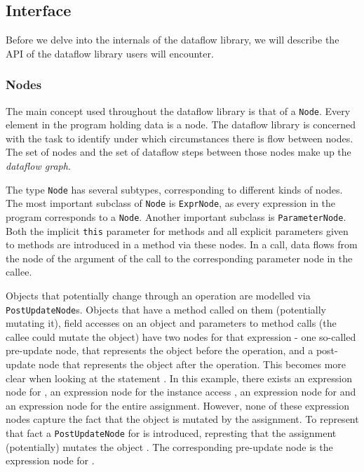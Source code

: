 \subsection{Interface}
Before we delve into the internals of the dataflow library, we will describe the API 
of the dataflow library users will encounter.

\subsubsection*{Nodes}
The main concept used throughout the dataflow library is that of a \texttt{Node}.
Every element in the program holding data is a node.
The dataflow library is concerned with the task to identify 
under which circumstances there is flow between nodes.
The set of nodes and the set of dataflow steps between those nodes make up the 
\emph{dataflow graph}.

The type \texttt{Node} has several subtypes, corresponding to different kinds of nodes.
The most important subclass of \texttt{Node} is \texttt{ExprNode}, 
as every expression in the program corresponds to a \texttt{Node}.
Another important subclass is \texttt{ParameterNode}.
Both the implicit \texttt{this} parameter for methods and all explicit parameters
given to methods are introduced in a method via these nodes.
In a call, data flows from the node of the argument of the 
call to the corresponding parameter node in the callee.

Objects that potentially change through an operation are modelled
 via \texttt{PostUpdateNode}s.
Objects that have a method called on them (potentially mutating it),
field accesses on an object and parameters to method calls (the callee could mutate the object)
have two nodes for that expression - one so-called pre-update node, that represents 
the object before the operation, and a post-update node that represents 
the object after the operation.
This becomes more clear when looking at the statement .
In this example, there exists an expression node for 
, an expression node for the instance access ,
an expression node for  and an expression node for the entire assignment.
However, none of these expression nodes capture the fact that the object 
is mutated by the assignment.
To represent that fact a \texttt{PostUpdateNode} for  is introduced,
represting that the assignment (potentially) mutates the object .
The corresponding pre-update node is the expression node for .

